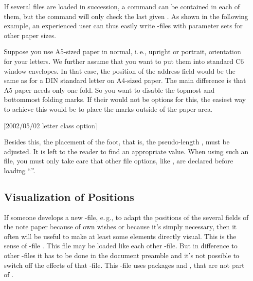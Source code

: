If several  files are loaded in succession, a
 command can be contained in each of them,
but the  command will only check the last given . As shown in the following example, an experienced user can thus
easily write -files with parameter sets for other paper sizes.
\iffalse%
If you do not plan to set up such \File{lco}-files yourself, you may just
forget about this option and skip the example.%
\fi
\begin{Example}
  Suppose you use A5-sized paper in normal, i.\,e., upright or portrait,
  orientation for your letters. We further assume that you want to put them
  into standard C6 window envelopes. In that case, the position of the address
  field would be the same as for a DIN standard letter on A4-sized paper. The
  main difference is that A5 paper needs only one fold. So you want to disable
  the topmost and bottommost folding marks. If their would not be options for
  this, the easiest way to achieve this would be to place the marks outside of
  the paper area.
\begin{lstcode}
               [2002/05/02 letter class option]
\end{lstcode}
  Besides this, the placement of the foot, that is, the pseudo-length
  , must be adjusted. It is left to the reader to find
  an appropriate value. When using such an  file, you must only take
  care that other  file options, like , are declared before
  loading ``''.
\iffalse%
  Does this seem too complicated?  Only before you have used it the first
  time. Anyway, how often do you write letters not using your standard formats
  for A4-size or letter-size paper?  
\fi%
\end{Example}
%


\subsection{Visualization of Positions}
\label{sec:scrlttr2-experts.visualize}

If someone develops a new -file, e.\,g., to adapt the positions of
the several fields of the note paper because of own wishes or because it's
simply necessary, then it often will be useful to make at least some elements
directly visual. This is the sense of -file
. This file may be
loaded like each other -file. But in difference to other
-files it has to be done in the document preamble and it's not
possible to switch off the effects of that -file. This
-file uses packages %
and , that are not part of
\KOMAScript.



